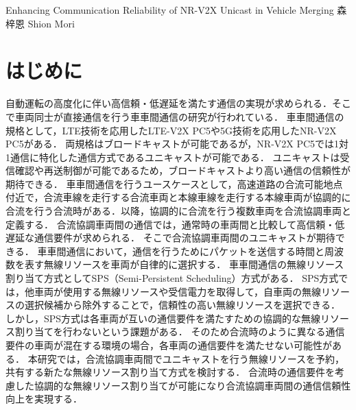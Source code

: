 \documentclass[a4paper,10pt,twocolumn,uplatex]{jsarticle}
\date{8}
\begin{document}
{Enhancing Communication Reliability of NR-V2X Unicast in Vehicle Merging}
{森 梓恩}
{Shion Mori}

\section{はじめに}
\label{はじめに}
自動運転の高度化に伴い高信頼・低遅延を満たす通信の実現が求められる．そこで車両同士が直接通信を行う車車間通信の研究が行われている．
車車間通信の規格として，LTE技術を応用したLTE-V2X PC5や5G技術を応用したNR-V2X PC5がある\cite{Tutorial}．
両規格はブロードキャストが可能であるが，NR-V2X PC5では1対1通信に特化した通信方式であるユニキャストが可能である．
ユニキャストは受信確認や再送制御が可能であるため，ブロードキャストより高い通信の信頼性が期待できる．
車車間通信を行うユースケースとして，高速道路の合流可能地点付近で，合流車線を走行する合流車両と本線車線を走行する本線車両が協調的に合流を行う合流時がある．以降，協調的に合流を行う複数車両を合流協調車両と定義する．
合流協調車両間の通信では，通常時の車両間と比較して高信頼・低遅延な通信要件が求められる．
そこで合流協調車両間のユニキャストが期待できる．
車車間通信において，通信を行うためにパケットを送信する時間と周波数を表す無線リソースを車両が自律的に選択する．
車車間通信の無線リソース割り当て方式としてSPS（Semi-Persistent Scheduling）方式がある．
SPS方式では，他車両が使用する無線リソースや受信電力を取得して，自車両の無線リソースの選択候補から除外することで，信頼性の高い無線リソースを選択できる．
しかし，SPS方式は各車両が互いの通信要件を満たすための協調的な無線リソース割り当てを行わないという課題がある．
そのため合流時のように異なる通信要件の車両が混在する環境の場合，各車両の通信要件を満たせない可能性がある．
本研究では，合流協調車両間でユニキャストを行う無線リソースを予約，共有する新たな無線リソース割り当て方式を検討する．
合流時の通信要件を考慮した協調的な無線リソース割り当てが可能になり合流協調車両間の通信信頼性向上を実現する．
\end{document}
